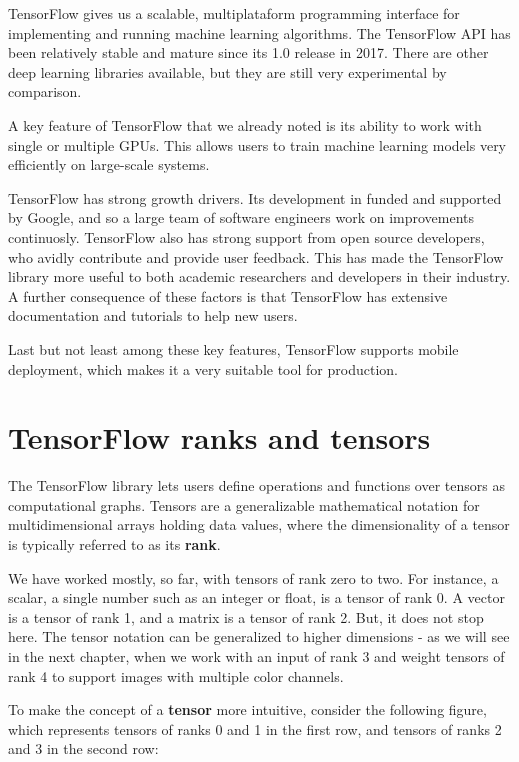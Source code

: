 \documentclass[11pt]{article}
\begin{document}
    TensorFlow gives us a scalable, multiplataform programming interface for
implementing and running machine learning algorithms. The TensorFlow API
has been relatively stable and mature since its 1.0 release in 2017.
There are other deep learning libraries available, but they are still
very experimental by comparison.

A key feature of TensorFlow that we already noted is its ability to work
with single or multiple GPUs. This allows users to train machine
learning models very efficiently on large-scale systems.

TensorFlow has strong growth drivers. Its development in funded and
supported by Google, and so a large team of software engineers work on
improvements continuosly. TensorFlow also has strong support from open
source developers, who avidly contribute and provide user feedback. This
has made the TensorFlow library more useful to both academic researchers
and developers in their industry. A further consequence of these factors
is that TensorFlow has extensive documentation and tutorials to help new
users.

Last but not least among these key features, TensorFlow supports mobile
deployment, which makes it a very suitable tool for production.

    \section{TensorFlow ranks and
tensors}\label{tensorflow-ranks-and-tensors}

    The TensorFlow library lets users define operations and functions over
tensors as computational graphs. Tensors are a generalizable
mathematical notation for multidimensional arrays holding data values,
where the dimensionality of a tensor is typically referred to as its
\textbf{rank}.

We have worked mostly, so far, with tensors of rank zero to two. For
instance, a scalar, a single number such as an integer or float, is a
tensor of rank 0. A vector is a tensor of rank 1, and a matrix is a
tensor of rank 2. But, it does not stop here. The tensor notation can be
generalized to higher dimensions - as we will see in the next chapter,
when we work with an input of rank 3 and weight tensors of rank 4 to
support images with multiple color channels.

To make the concept of a \textbf{tensor} more intuitive, consider the
following figure, which represents tensors of ranks 0 and 1 in the first
row, and tensors of ranks 2 and 3 in the second row:
\end{document}
